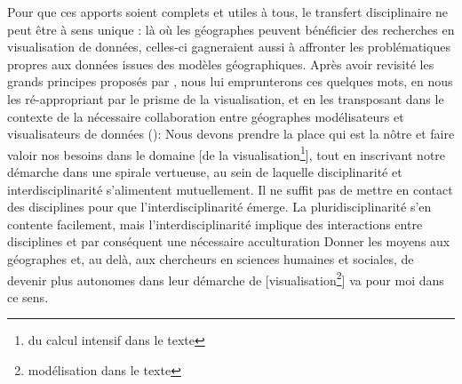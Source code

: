 \documentclass[a4paper, 12pt]{article}
\begin{document}
Pour que ces apports soient complets et utiles à tous, le transfert disciplinaire ne peut être à sens unique : là où les géographes peuvent bénéficier des recherches en visualisation de données, celles-ci gagneraient aussi à affronter les problématiques propres aux données issues des modèles géographiques.
Après avoir revisité les grands principes proposés par , nous lui emprunterons ces quelques mots, en nous les ré-appropriant par le prisme de la visualisation, et en les transposant dans le contexte de la nécessaire collaboration entre géographes modélisateurs et visualisateurs de données (\citeyear[\ppno~75--76]{banos_pour_2013}): \og Nous devons prendre la place qui est la nôtre et faire valoir nos besoins dans le domaine [de la visualisation\footnote{\og du calcul intensif\fg{} dans le texte}], tout en inscrivant notre démarche dans une spirale vertueuse, au sein de laquelle disciplinarité et interdisciplinarité s'alimentent mutuellement.
Il ne suffit pas de mettre en contact des disciplines pour que l'interdisciplinarité émerge.
La pluridisciplinarité s'en contente facilement, mais l'interdisciplinarité implique des interactions entre disciplines et par conséquent une nécessaire acculturation \textelp{}
Donner les moyens aux géographes et, au delà, aux chercheurs en sciences humaines et sociales, de devenir plus autonomes dans leur démarche de [visualisation\footnote{\og modélisation\fg{} dans le texte}] va pour moi dans ce sens.\fg{}


\clearpage
\printbibliography[title={Références}]
\end{document}
